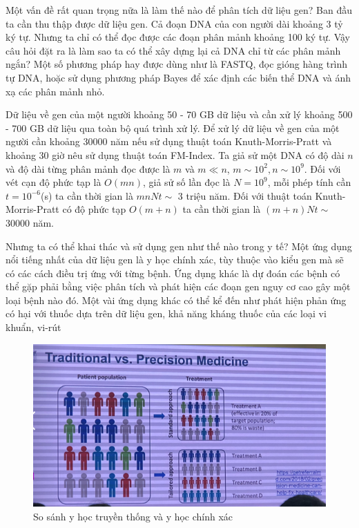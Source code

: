 \documentclass[14pt, a4paper]{article}
\numberwithin{equation}{section}
\numberwithin{figure}{section}
\numberwithin{dl}{section}
\numberwithin{md}{section}
\numberwithin{bd}{section}
\numberwithin{dn}{section}
\numberwithin{hq}{section}
\begin{document}
    Một vấn đề rất quan trọng nữa là làm thế nào để phân tích dữ liệu gen? Ban đầu ta cần thu thập được dữ liệu gen.
    Cả đoạn DNA của con người dài khoảng 3 tỷ ký tự. Nhưng ta chỉ có thể đọc được các đoạn phân mảnh khoảng 100 ký tự.
    Vậy câu hỏi đặt ra là làm sao ta có thể xây dựng lại cả DNA chỉ từ các phân mảnh ngắn? Một số phương pháp hay được dùng như là FASTQ, đọc gióng hàng trình tự DNA, hoặc sử dụng phương pháp Bayes để xác định các biến thể DNA và ánh xạ các phân mảnh nhỏ.

    Dữ liệu về gen của một người khoảng 50 - 70 GB dữ liệu và cần xử lý khoảng 500 - 700 GB dữ liệu qua toàn bộ quá trình xử lý.
    Để xử lý dữ liệu về gen của một người cần khoảng 30000 năm nếu sử dụng thuật toán Knuth-Morris-Pratt và khoảng 30 giờ nêu sử dụng thuật toán FM-Index.
    Ta giả sử một DNA có độ dài $n$ và độ dài từng phân mảnh đọc được là $m$ và $m \ll n$, $m \sim 10^2, n \sim 10^9$.
    Đối với vét cạn độ phức tạp là $O(mn)$, giả sử số lần đọc là $N=10^9$, mỗi phép tính cần $t=10^{-6}$(s) ta cần thời gian là $mnNt\sim$ 3 triệu năm.
    Đối với thuật toán Knuth-Morris-Pratt có độ phức tạp $O(m+n)$ ta cần thời gian là $(m+n)Nt\sim$ 30000 năm.

    Nhưng ta có thể khai thác và sử dụng gen như thế nào trong y tế? 
    Một ứng dụng nổi tiếng nhất của dữ liệu gen là y học chính xác, tùy thuộc vào kiểu gen mà sẽ có các cách điều trị ứng với từng bệnh.
    Ứng dụng khác là dự đoán các bệnh có thể gặp phải bằng việc phân tích và phát hiện các đoạn gen nguy cơ cao gây một loại bệnh nào đó.
    Một vài ứng dụng khác có thể kể đến như phát hiện phản ứng có hại với thuốc dựa trên dữ liệu gen, khả năng kháng thuốc của các loại vi khuẩn, vi-rút 


    \begin{figure}[h!]
        \centering
        \includegraphics[scale=0.8]{Precise_Medicine.png}
        \caption{So sánh y học truyền thống và y học chính xác}
    \end{figure}
\end{document}

